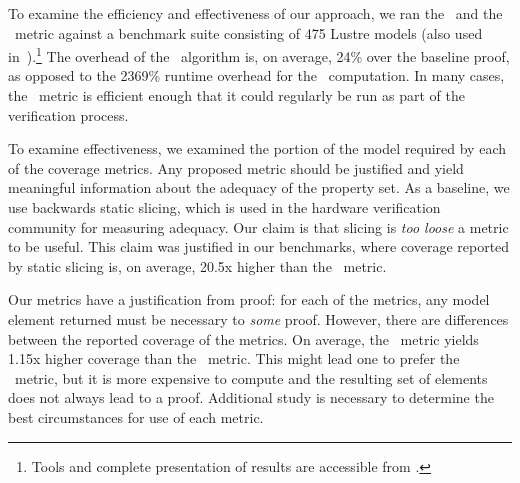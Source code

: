 
To examine the efficiency and effectiveness of our approach, we ran the \mustcov\ and the \ivccov\ metric against a benchmark suite consisting of 475 Lustre models (also used in~\cite{Ghass16,Hagen08:FMCAD,Kahsai2011}).\footnote{Tools and complete presentation of results are accessible from \cite{anoexpr}.}
The overhead of the \ucalg\ algorithm is, on average, 24\% over the baseline proof, as opposed to the 2369\% runtime overhead for the \mustcov\ computation.  In many cases, the \ivccov\ metric is efficient enough that it could regularly be run as part of the verification process.

To examine effectiveness, we examined the portion of the model required by each of the coverage metrics.  Any proposed metric should be justified and yield meaningful information about the adequacy of the property set.  As a baseline, we use backwards static slicing, which is used in the hardware verification community for measuring adequacy.  Our claim is that slicing is {\em too loose} a metric to be useful.  This claim was justified in our benchmarks, where coverage reported by static slicing is, on average, 20.5x higher than the \ivccov\ metric.

Our metrics have a justification from proof: for each of the metrics, any model element returned must be necessary to {\em some} proof.  However, there are differences between the reported coverage of the metrics.  On average, the \ivccov\ metric yields 1.15x higher coverage than the \mustcov\ metric.  This might lead one to prefer the \mustcov\ metric, but it is more expensive to compute and the resulting set of elements does not always lead to a proof.  Additional study is necessary to determine the best circumstances for use of each metric.

